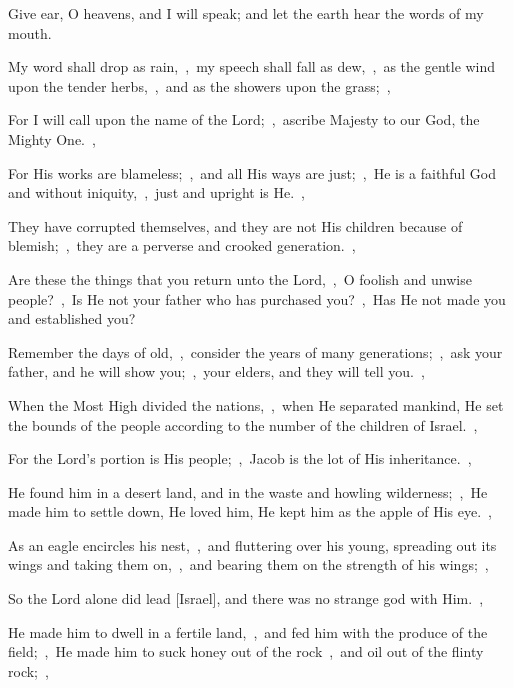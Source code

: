 \documentclass[12pt,twoside,a5paper]{article}
\begin{document}
\begin{normalparskip}
   Give ear, O heavens, and I will speak; and let the earth hear the words of my mouth.


  My word shall drop as rain,~\sep\ my speech shall fall as dew,~\sep\ as the gentle wind upon the tender herbs,~\sep\ and as the showers upon the grass;~\sep

  For I will call upon the name of the Lord;~\sep\ ascribe Majesty to our God, the Mighty One.~\sep

  For His works are blameless;~\sep\ and all His ways are just;~\sep\ He is a faithful God and without iniquity,~\sep\ just and upright is He.~\sep

  They have corrupted themselves, and they are not His children because of blemish;~\sep\ they are a perverse and crooked generation.~\sep

  Are these the things that you return unto the Lord,~\sep\ O foolish and unwise people?~\sep\ Is He not your father who has purchased you?~\sep\ Has He not made you and established you?

  Remember the days of old,~\sep\ consider the years of many generations;~\sep\ ask your father, and he will show you;~\sep\ your elders, and they will tell you.~\sep

  When the Most High divided the nations,~\sep\ when He separated mankind, He set the bounds of the people according to the number of the children of Israel.~\sep

  For the Lord's portion is His people;~\sep\ Jacob is the lot of His inheritance.~\sep

  He found him in a desert land, and in the waste and howling wilderness;~\sep\ He made him to settle down, He loved him, He kept him as the apple of His eye.~\sep

  As an eagle encircles his nest,~\sep\ and fluttering over his young, spreading out its wings and taking them on,~\sep\ and bearing them on the strength of his wings;~\sep

  So the Lord alone did lead [Israel], and there was no strange god with Him.~\sep

  He made him to dwell in a fertile land,~\sep\ and fed him with the produce of the field;~\sep\ He made him to suck honey out of the rock~\sep\ and oil out of the flinty rock;~\sep


\end{normalparskip}
\end{document}
